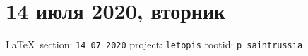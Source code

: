  
 

\section{14 июля 2020, вторник}
\label{sec:14_07_2020}


\vspace{0.5cm}
{\ifDEBUG\small\LaTeX~section: \verb|14_07_2020| project: \verb|letopis| rootid: \verb|p_saintrussia|\fi}
\vspace{0.5cm}



